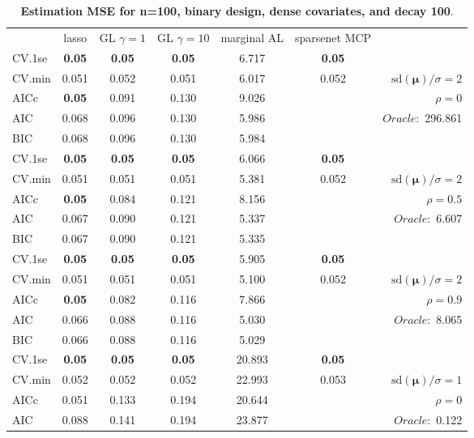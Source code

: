 \clearpage
\begin{table}\vspace{-.5cm}
\caption[l]{ { \bf Estimation MSE for n=100, binary design, 
dense covariates, and  decay  100}.}
\vspace{-.5cm}
\footnotesize{}
\begin{center}
\begin{tabular}{l*{5}{c}|r}
& lasso & GL $\gamma=1$ & GL $\gamma=10$ & marginal AL & sparsenet MCP  & \\
 \cline{1-7}
CV.1se & {\bf 0.05} & {\bf 0.05} & {\bf 0.05} & 6.717 & {\bf 0.05} & \\
CV.min & 0.051 & 0.052 & 0.051 & 6.017 & 0.052 &  $\mathrm{sd}(\mathbf{\mu})/\sigma=2$ \\
AICc & {\bf 0.05} & 0.091 & 0.130 & 9.026 & & $\rho=0$ \\
AIC & 0.068 & 0.096 & 0.130 & 5.986 & &  \multirow{2}{*}{$Oracle: $ 296.861} \\
BIC & 0.068 & 0.096 & 0.130 & 5.984 & &  \\
 \hline 
CV.1se & {\bf 0.05} & {\bf 0.05} & {\bf 0.05} & 6.066 & {\bf 0.05} & \\
CV.min & 0.051 & 0.051 & 0.051 & 5.381 & 0.052 &  $\mathrm{sd}(\mathbf{\mu})/\sigma=2$ \\
AICc & {\bf 0.05} & 0.084 & 0.121 & 8.156 & & $\rho=0.5$ \\
AIC & 0.067 & 0.090 & 0.121 & 5.337 & &  \multirow{2}{*}{$Oracle: $ 6.607} \\
BIC & 0.067 & 0.090 & 0.121 & 5.335 & &  \\
 \hline 
CV.1se & {\bf 0.05} & {\bf 0.05} & {\bf 0.05} & 5.905 & {\bf 0.05} & \\
CV.min & 0.051 & 0.051 & 0.051 & 5.100 & 0.052 &  $\mathrm{sd}(\mathbf{\mu})/\sigma=2$ \\
AICc & {\bf 0.05} & 0.082 & 0.116 & 7.866 & & $\rho=0.9$ \\
AIC & 0.066 & 0.088 & 0.116 & 5.030 & &  \multirow{2}{*}{$Oracle: $ 8.065} \\
BIC & 0.066 & 0.088 & 0.116 & 5.029 & &  \\
 \hline 
CV.1se & {\bf 0.05} & {\bf 0.05} & {\bf 0.05} & 20.893 & {\bf 0.05} & \\
CV.min & 0.052 & 0.052 & 0.052 & 22.993 & 0.053 &  $\mathrm{sd}(\mathbf{\mu})/\sigma=1$ \\
AICc & 0.051 & 0.133 & 0.194 & 20.644 & & $\rho=0$ \\
AIC & 0.088 & 0.141 & 0.194 & 23.877 & &  \multirow{2}{*}{$Oracle: $ 0.122} \\

\end{tabular}
\end{center}
\end{table}
